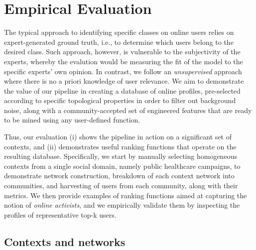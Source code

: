 \section{Empirical Evaluation} \label{sec:evaluation}

The typical approach to identifying specific classes on online users relies on expert-generated ground truth, i.e., to determine which users belong to the desired class. 
Such approach, however, is vulnerable to  the subjectivity of the experts, whereby the evalution would  be measuring the fit of the model to the specific experts' own opinion. 
In contrast, we follow an \textit{unsupervised} approach where there is no a priori knowledge of user relevance.  
We aim to demonstrate the value of our pipeline in creating a database of online profiles, pre-selected according to specific topological properties in order to filter out background noise,  along with a community-accepted set of engineered features that are ready to be mined using any user-defined function.

Thus, our evaluation (i) shows the pipeline in action on a significant set of contexts, and (ii) demonstrates useful ranking functions that operate on the resulting database.
Specifically, we  start by manually selecting homogeneous contexts from a single social domain, namely public healthcare campaigns, to demonstrate network construction, breakdown of each  context network into communities, and harvesting of users from each community, along with their metrics.
We then provide examples of ranking functions aimed at capturing the notion of  \textit{online activists}, and we empirically validate them by inspecting the profiles of representative top-k users.


\subsection{Contexts and networks} \label{sec:contexts}
 
